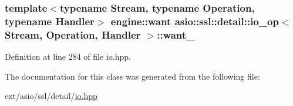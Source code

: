 \subsubsection[{want\+\_\+}]{\setlength{\rightskip}{0pt plus 5cm}template$<$typename Stream, typename Operation, typename Handler$>$ {\bf engine\+::want} {\bf asio\+::ssl\+::detail\+::io\+\_\+op}$<$ Stream, Operation, Handler $>$\+::want\+\_\+}\label{classasio_1_1ssl_1_1detail_1_1io__op_a8046c9964a8fd25d82af1c7008c10aed}


Definition at line 284 of file io.\+hpp.



The documentation for this class was generated from the following file\+:\begin{DoxyCompactItemize}
\item 
ext/asio/ssl/detail/\hyperlink{io_8hpp}{io.\+hpp}\end{DoxyCompactItemize}
